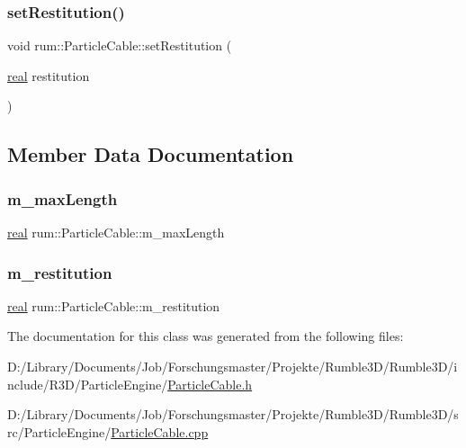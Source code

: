 \subsubsection{\texorpdfstring{set\+Restitution()}{setRestitution()}}
{\footnotesize\ttfamily void rum\+::\+Particle\+Cable\+::set\+Restitution (\begin{DoxyParamCaption}\item[{\mbox{\hyperlink{namespacerum_a7e8cca23573d5eaead0f138cbaa4862c}{real}}}]{restitution }\end{DoxyParamCaption})}



\subsection{Member Data Documentation}
\mbox{\label{classrum_1_1_particle_cable_a7232daf25d24eff2f98e03918bfbfb7c}} 
\subsubsection{\texorpdfstring{m\+\_\+max\+Length}{m\_maxLength}}
{\footnotesize\ttfamily \mbox{\hyperlink{namespacerum_a7e8cca23573d5eaead0f138cbaa4862c}{real}} rum\+::\+Particle\+Cable\+::m\+\_\+max\+Length\hspace{0.3cm}{\ttfamily [protected]}}

\mbox{\label{classrum_1_1_particle_cable_affbb776b02c85a36d0d0bb1ca6f4234a}} 
\subsubsection{\texorpdfstring{m\+\_\+restitution}{m\_restitution}}
{\footnotesize\ttfamily \mbox{\hyperlink{namespacerum_a7e8cca23573d5eaead0f138cbaa4862c}{real}} rum\+::\+Particle\+Cable\+::m\+\_\+restitution\hspace{0.3cm}{\ttfamily [protected]}}



The documentation for this class was generated from the following files\+:\begin{DoxyCompactItemize}
\item 
D\+:/\+Library/\+Documents/\+Job/\+Forschungsmaster/\+Projekte/\+Rumble3\+D/\+Rumble3\+D/include/\+R3\+D/\+Particle\+Engine/\mbox{\hyperlink{_particle_cable_8h}{Particle\+Cable.\+h}}\item 
D\+:/\+Library/\+Documents/\+Job/\+Forschungsmaster/\+Projekte/\+Rumble3\+D/\+Rumble3\+D/src/\+Particle\+Engine/\mbox{\hyperlink{_particle_cable_8cpp}{Particle\+Cable.\+cpp}}\end{DoxyCompactItemize}
